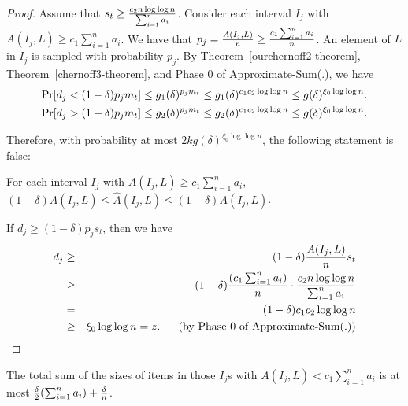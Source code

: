 \documentclass[runningheads]{llncs}
\newcommand{\prob}{{\rm Pr}}
\begin{document}
\begin{proof}
Assume that $s_t\ge{ c_2n\log\log n\over \sum_{i=1}^n a_i}$.
Consider each interval $I_j$ with $A(I_j, L)\ge c_1\sum_{i=1}^n
a_i$. We have that $p_j={A(I_j,L)\over n}\ge {c_1\sum_{i=1}^n
a_i\over n}$. An element of $L$ in $I_j$ is sampled with probability
$p_j$.  By Theorem~\ref{ourchernoff2-theorem},
Theorem~\ref{chernoff3-theorem}, and Phase 0 of Approximate-Sum(.),
we have
\begin{eqnarray}
\prob[d_j<(1-\delta)p_jm_t]\le g_1(\delta)^{p_jm_t}\le
g_1(\delta)^{c_1c_2\log\log n}\le g(\delta)^{\xi_0\log\log n}.\\
\prob[d_j>(1+\delta)p_jm_t]\le g_2(\delta)^{p_jm_t}\le
g_2(\delta)^{c_1c_2\log\log n}\le g(\delta)^{\xi_0\log\log n}.
\end{eqnarray}

Therefore, with probability at most $2kg(\delta)^{\xi_0\log\log n}$,
the following statement is false:

For each interval $I_j$ with $A(I_j, L)\ge c_1\sum_{i=1}^n a_i$,
$(1-\delta)A(I_j,L)\le \hat{A}(I_j,L)\le (1+\delta)A(I_j,L)$.



If $d_j\ge (1-\delta)p_j s_t$, then we have
\begin{eqnarray*}
d_j&\ge&  (1-\delta){A(I_j, L)\over n} s_t\\
&\ge& (1-\delta){(c_1\sum_{i=1}^n a_i)\over n}\cdot {
c_2n\log\log n\over \sum_{i=1}^n a_i}\\
&=&(1-\delta)c_1c_2\log\log n\\
&\ge& \xi_0\log\log n= z. \ \ \ \ \ \mbox{(by\ Phase\ 0\ of\
Approximate-Sum(.))}
\end{eqnarray*}
\end{proof}






\begin{lemma}\label{lemma.3}
The total sum of the sizes of items in those $I_j$s with $A(I_j, L)<
c_1\sum_{i=1}^n a_i$ is at most ${ \delta\over 2}(\sum_{i=1}^n
a_i)+{\delta\over n}$.
\end{lemma}
\end{document}
